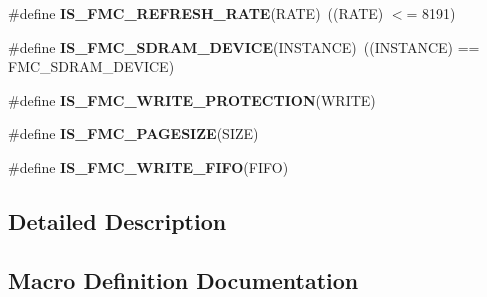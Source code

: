 \begin{DoxyCompactItemize}
\item 
\#define {\bfseries I\+S\+\_\+\+F\+M\+C\+\_\+\+R\+E\+F\+R\+E\+S\+H\+\_\+\+R\+A\+TE}(R\+A\+TE)~((R\+A\+TE) $<$= 8191)\hypertarget{group___f_s_m_c___l_l___assert___macros_ga0e35521440f9b9bf43d18ce5de624395}{}\label{group___f_s_m_c___l_l___assert___macros_ga0e35521440f9b9bf43d18ce5de624395}

\item 
\#define {\bfseries I\+S\+\_\+\+F\+M\+C\+\_\+\+S\+D\+R\+A\+M\+\_\+\+D\+E\+V\+I\+CE}(I\+N\+S\+T\+A\+N\+CE)~((I\+N\+S\+T\+A\+N\+CE) == F\+M\+C\+\_\+\+S\+D\+R\+A\+M\+\_\+\+D\+E\+V\+I\+CE)\hypertarget{group___f_s_m_c___l_l___assert___macros_gadd16764ad1b64f810e14d161f70088cc}{}\label{group___f_s_m_c___l_l___assert___macros_gadd16764ad1b64f810e14d161f70088cc}

\item 
\#define {\bfseries I\+S\+\_\+\+F\+M\+C\+\_\+\+W\+R\+I\+T\+E\+\_\+\+P\+R\+O\+T\+E\+C\+T\+I\+ON}(W\+R\+I\+TE)
\item 
\#define {\bfseries I\+S\+\_\+\+F\+M\+C\+\_\+\+P\+A\+G\+E\+S\+I\+ZE}(S\+I\+ZE)
\item 
\#define {\bfseries I\+S\+\_\+\+F\+M\+C\+\_\+\+W\+R\+I\+T\+E\+\_\+\+F\+I\+FO}(F\+I\+FO)
\end{DoxyCompactItemize}


\subsection{Detailed Description}


\subsection{Macro Definition Documentation}
